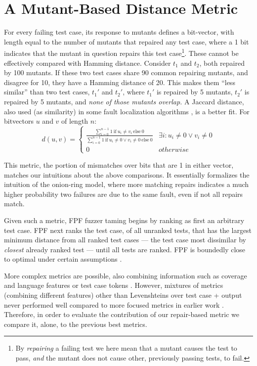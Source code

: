\section{A Mutant-Based Distance Metric}

For every failing test case, its response to mutants defines a bit-vector, with
length equal to the number of mutants that repaired any test case,
where a 1 bit indicates that the mutant in question repairs this test
case\footnote{By \emph{repairing} a failing test we here mean that a mutant
causes the test to pass, \emph{and} the mutant does not cause
other, previously passing tests, to fail.}.  These cannot be effectively compared with Hamming distance. Consider $t_1$ and $t_2$, both repaired
by 100 mutants.  If these two test cases share 90 common repairing
mutants, and disagree for 10, they have a Hamming
distance of 20.  This makes them ``less similar'' than two test cases,
$t_1'$ and $t_2'$, where $t_1'$ is repaired by 5 mutants, $t_2'$ is
repaired by 5 mutants, and \emph{none of those mutants overlap.}   A Jaccard distance, also used (as similarity) in some fault
localization algorithms \cite{Pinpoint}, is a better fit.  For bitvectors $u$ and $v$ of length $n$:
\[d(u,v) = 
\begin{cases}
\frac{\sum_{i=0}^{n-1} 1\ \text{if}\ u_i \neq v_i\ \text{else}\ 0}{\sum_{i=0}^{n-1} 1
\  \text{if}\ u_i \neq 0 \vee v_i \neq 0\ \text{else}\ 0} & \exists i:u_i\neq 0 \vee v_i\neq 0\\
0 & otherwise
\end{cases}
\]

This metric, the portion of mismatches over bits that are 1 in either
vector, matches our intuitions about the above comparisons.  It
essentially formalizes the intuition of the onion-ring model, where
more matching repairs indicates a much higher probability two failures
are due to the same fault, even if not all repairs match.

Given such a metric, FPF \cite{Gonzalez} fuzzer taming \cite{PLDI13}
begins by ranking as first an arbitrary test case.   FPF next ranks the test
case, of all unranked tests, that has the largest minimum distance
from all ranked test cases --- the test case most dissimilar by \emph{closest}
already ranked test --- until all tests are ranked.  FPF is boundedly close
to optimal under certain assumptions \cite{Gonzalez}.

More complex metrics are possible, also combining information such as
coverage and language features or test case tokens \cite{PLDI13}.
However, mixtures of metrics (combining different features) other than
Levenshteins \cite{lev} over test case + output never performed well
compared to more focused metrics in earlier work \cite{PLDI13}.
Therefore, in order to evaluate the contribution of our repair-based
metric we compare it, alone, to the previous best metrics.

